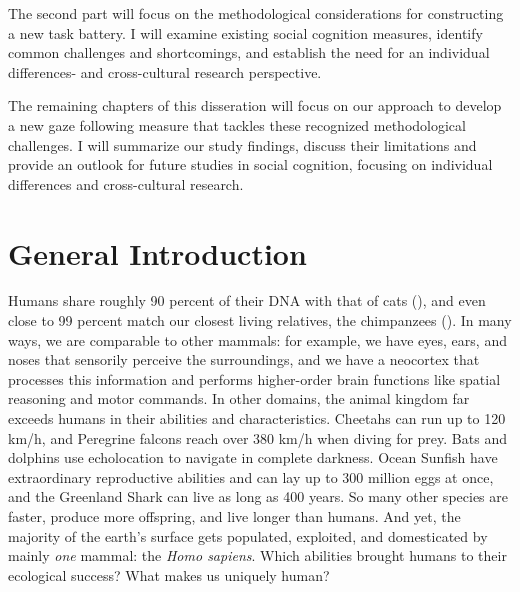 \documentclass[
]{scrbook}
\begin{document}
The second part will focus on the methodological considerations for constructing a new task battery. I will examine existing social cognition measures, identify common challenges and shortcomings, and establish the need for an individual differences- and cross-cultural research perspective.

The remaining chapters of this disseration will focus on our approach to develop a new gaze following measure that tackles these recognized methodological challenges. I will summarize our study findings, discuss their limitations and provide an outlook for future studies in social cognition, focusing on individual differences and cross-cultural research.

\mainmatter

\chapter{General Introduction}\label{introduction}

Humans share roughly 90 percent of their DNA with that of cats (), and even close to 99 percent match our closest living relatives, the chimpanzees (). In many ways, we are comparable to other mammals: for example, we have eyes, ears, and noses that sensorily perceive the surroundings, and we have a neocortex that processes this information and performs higher-order brain functions like spatial reasoning and motor commands. In other domains, the animal kingdom far exceeds humans in their abilities and characteristics. Cheetahs can run up to 120 km/h, and Peregrine falcons reach over 380 km/h when diving for prey. Bats and dolphins use echolocation to navigate in complete darkness. Ocean Sunfish have extraordinary reproductive abilities and can lay up to 300 million eggs at once, and the Greenland Shark can live as long as 400 years. So many other species are faster, produce more offspring, and live longer than humans. And yet, the majority of the earth's surface gets populated, exploited, and domesticated by mainly \emph{one} mammal: the \emph{Homo sapiens}. Which abilities brought humans to their ecological success? What makes us uniquely human?
\end{document}
